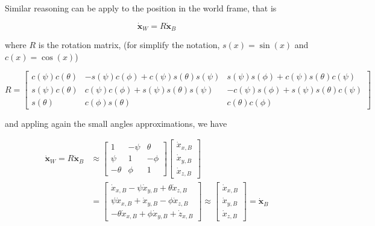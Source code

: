 \noindent Similar reasoning can be apply to the position in the world frame, that is

\begin{equation}
	\dot{\mathbf{x}}_W = R\dot{\mathbf{x}}_B
\end{equation}

\noindent where $R$ is the rotation matrix, (for simplify the notation, $s(x)=\sin(x)$ and $c(x)=\cos(x)$)

\begin{equation*}
	R = 
	\begin{bmatrix}
		c(\psi)c(\theta) & -s(\psi)c(\phi)+c(\psi)s(\theta)s(\psi) & s(\psi)s(\phi)+c(\psi)s(\theta)c(\psi) \\
		s(\psi)c(\theta) & c(\psi)c(\phi)+s(\psi)s(\theta)s(\psi) & -c(\psi)s(\phi)+s(\psi)s(\theta)c(\psi) \\
		s(\theta) & c(\phi)s(\theta) & c(\theta)c(\phi)
	\end{bmatrix}
\end{equation*} 

\noindent and appling again the small angles approximations, we have

\begin{align}
	\dot{\mathbf{x}}_W = R\dot{\mathbf{x}}_B &\approx
	\begin{bmatrix}
		1 & -\psi & \theta \\
		\psi & 1 & -\phi \\
		-\theta & \phi & 1
	\end{bmatrix}
	\begin{bmatrix}
		\dot{x}_{x,B} \\
		\dot{x}_{y,B} \\
		\dot{x}_{z,B} 
	\end{bmatrix} \nonumber \\
	&= 
	\begin{bmatrix}
		\dot{x}_{x,B}-\psi\dot{x}_{y,B}+\theta\dot{x}_{z,B} \\
		\psi\dot{x}_{x,B}+\dot{x}_{y,B}-\phi\dot{x}_{z,B} \\
		-\theta\dot{x}_{x,B}+\phi\dot{x}_{y,B}+\dot{z}_{x,B}
	\end{bmatrix}
	\approx
	\begin{bmatrix}
		\dot{x}_{x,B} \\
		\dot{x}_{y,B} \\
		\dot{x}_{z,B}
	\end{bmatrix}
	= 
	\dot{\mathbf{x}}_B
	\label{eq:MPCdyn5}
\end{align}

